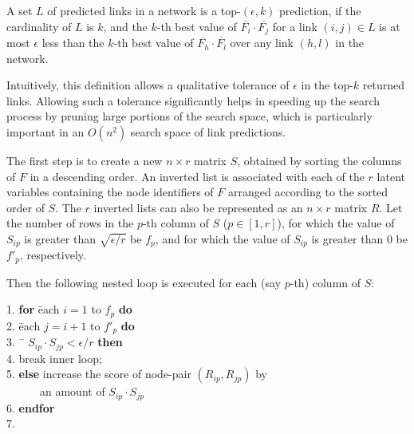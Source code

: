 \begin{definition}[top-$(\epsilon, k)$ predictions]
A set $L$ of predicted links in a network is a top-$(\epsilon, k)$ prediction, if
the cardinality of $L$ is $k$, and the $k$-th best  value of
$\overline{F_i} \cdot \overline{F_j}$ for a link $(i, j) \in L$ is
at most $\epsilon$ less than the $k$-th best value of
$\overline{F_h} \cdot \overline{F_l}$ over any link $(h , l)$ in the
network.
\end{definition}
Intuitively, this definition allows a qualitative  tolerance of
$\epsilon$ in the top-$k$ returned links. Allowing such a tolerance
significantly helps in speeding up the search process by pruning
large portions of the search space, which is particularly important
in an $O(n^2)$ search space of link predictions.

The first step is to create a new $n \times r$ matrix $S$, 
obtained by sorting the columns of $F$ in a descending order. An inverted list is
associated with each of the $r$ latent variables containing the node
identifiers  of $F$ arranged according to the sorted order of $S$. The
$r$ inverted lists can also be represented as an $n \times r$ matrix
$R$. Let the number of rows in the $p$-th column of $S$ ($p\in[1, r]$), for which
the value of $S_{ip}$ is greater than $\sqrt{\epsilon/r}$ be $f_p$, and for which the value of $S_{ip}$ is greater than 0 be $f'_p$, respectively.

Then the following nested loop is executed for each (say $p$-th) column of $S$:

\vspace{-1ex}
\begin{tabbing}1. \hspace{5ex}\=
{\bf for} \= each $i=1$ to $f_p$ {\bf do}\\
2. \> \= each $j=i+1$ to $f'_p$ {\bf do}\\
3. \>\>\ \= $S_{ip} \cdot S_{jp} < \epsilon/r$ {\bf then}\\
4. \>\>\>\>break inner loop; \\
5. \>\>\> {\bf else} increase the score of node-pair $(R_{ip}, R_{jp})$ by \\
   \>\>\> \ \ \ \ \ \ an amount of $S_{ip} \cdot S_{jp}$\\
6. \>\> {\bf endfor}\\
7. 
\end{tabbing}
\vspace{-1ex}

